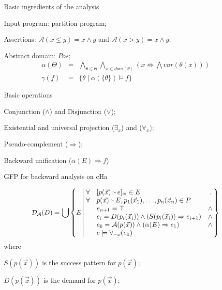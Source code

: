 \documentclass{beamer}
\newenvironment{tightitemize}{\begin{description}%
                          \setlength{\parskip 0pt}%
                          \setlength{\topsep 0pt}%
                          \setlength{\itemsep 2pt}%
                          \setlength{\partopsep 0pt}}%
                         {\end{description}}
\newcommand\comments[1]{}
\def\neck           {{\, \mbox{:-} \,}}
\begin{document}
\begin{frame}{Basic ingredients of the analysis} \vspace{\fill}

\begin{tightitemize}
\item Input program: partition program;

\item Assertions: $\mathcal{A}( x \leq y )=  x\wedge y$ and
$\mathcal{A}( x > y )=  x\wedge y$;

\item Abstract domain: $Pos$;
\begin{eqnarray*}
\alpha(\Theta) &=& \bigwedge_{\theta\in\Theta} \bigwedge_{x\in
dom(\theta)} ( x\Leftrightarrow \bigwedge var(\theta(x)) )\\
\gamma(f) &=& \{\theta \mid \alpha(\{\theta\}) \models f\}
\end{eqnarray*}

\item Basic operations
    \begin{tightitemize}
        \item Conjunction ($\wedge$) and Disjunction ($\vee$);
        \item Existential and universal projection ($\exists_x$) and
        ($\forall_x$);
        \item Pseudo-complement ($\Rightarrow$);
        \item Backward unification ($\alpha({E}) \Rightarrow f$)
    \end{tightitemize}
\end{tightitemize}
\vspace{\fill}
\end{frame}

{
\begin{frame}{GFP for backward analysis on cHa}
\vspace{\fill}

\[ \mathcal{D}_{\mathcal{A}}(D) = \bigcup \left\{ E
\left| \,
\begin{array}{@{}clc@{}}
\forall & [{p(\vec{x}) \neck e}]_{\approx} \in E & . \\
\forall & p(\vec{x}) \neck E, p_1(\vec{x}_1), \ldots, p_n(\vec{x}_n) \in P & . \\
& e_{n+1} = \top & \wedge \\
& e_{i} = D(p_i(\vec{x}_i)) \wedge (S(p_i(\vec{x}_i)) \Rightarrow e_{i+1})
& \wedge \\
& e_0 = \mathcal{A}(p(\vec{x})) \wedge (\alpha(E) \Rightarrow e_1) &\wedge \\
& e \models \forall_{-\vec{x}}(e_0) &
\end{array}
\right. \right\}
\]
where
\begin{tightitemize}
    \item $S(p(\vec{x}))$ is the success pattern for $p(\vec{x})$;
    \item $D(p(\vec{x}))$ is the demand for $p(\vec{x})$;
\end{tightitemize}

\vspace{\fill}
\end{frame}
}
\end{document}
